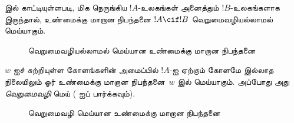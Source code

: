 \documentclass[../../../include/open-logic-section]{subfiles}
\begin{document}


 இல் காட்டியுள்ளபடி, மிக நெருங்கிய $!A$-உலகங்கள்
அனைத்தும் $!B$-உலகங்களாக இருந்தால், உண்மைக்கு மாறான நிபந்தனை $!A \cif
!B$ வெறுமைவழியல்லாமல் மெய்யாகும்.
\begin{figure}
\begin{center}
\caption{வெறுமைவழியல்லாமல் மெய்யான உண்மைக்கு மாறான நிபந்தனை}
\end{center}
\end{figure}
$w$ ஐச் சுற்றியுள்ள கோளங்களின் அமைப்பில் $!A$-ஐ ஏற்கும் கோளமே இல்லாத
நிலையிலும் ஓர் உண்மைக்கு மாறான நிபந்தனை~$w$ இல் மெய்யாகும். அப்போது அது
\emph{வெறுமைவழி} மெய் ( ஐப் பார்க்கவும்).
\begin{figure}
\begin{center}
\caption{வெறுமைவழி மெய்யான உண்மைக்கு மாறான நிபந்தனை}
\end{center}
\end{figure}
\end{document}
